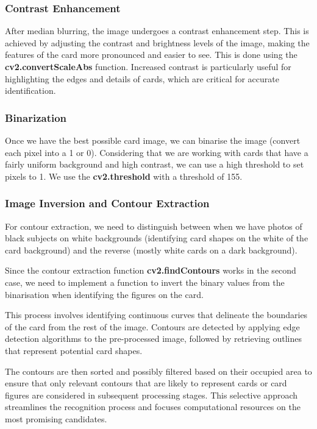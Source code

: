 \documentclass[twocolumn, a4paper,10pt]{article}
\begin{document}
\subsubsection*{Contrast Enhancement}
After median blurring, the image undergoes a contrast enhancement step. This is achieved by adjusting the contrast and brightness levels of the image, making the features of the card more pronounced and easier to see. This is done using the \textbf{cv2.convertScaleAbs} function. Increased contrast is particularly useful for highlighting the edges and details of cards, which are critical for accurate identification.

\subsubsection*{Binarization}
Once we have the best possible card image, we can binarise the image (convert each pixel into a 1 or 0). Considering that we are working with cards that have a fairly uniform background and high contrast, we can use a high threshold to set pixels to 1. We use the \textbf{cv2.threshold} with a threshold of 155.

\subsubsection*{Image Inversion and Contour Extraction}
For contour extraction, we need to distinguish between when we have photos of black subjects on white backgrounds (identifying card shapes on the white of the card background) and the reverse (mostly white cards on a dark background).

Since the contour extraction function \textbf{cv2.findContours} works in the second case, we need to implement a function to invert the binary values from the binarisation when identifying the figures on the card.

This process involves identifying continuous curves that delineate the boundaries of the card from the rest of the image. Contours are detected by applying edge detection algorithms to the pre-processed image, followed by retrieving outlines that represent potential card shapes.

The contours are then sorted and possibly filtered based on their occupied area to ensure that only relevant contours that are likely to represent cards or card figures are considered in subsequent processing stages. This selective approach streamlines the recognition process and focuses computational resources on the most promising candidates.
\\
\end{document}
